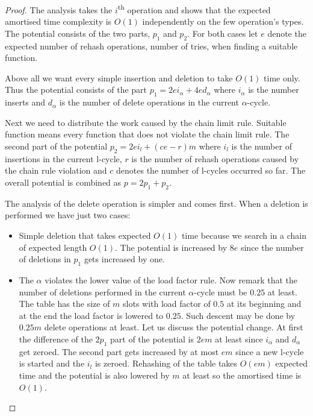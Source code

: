 \begin{proof}
The analysis takes the $i$\textsuperscript{th} operation and shows that the expected amortised time complexity is $O(1)$ independently on the few operation's types. The potential consists of the two parts, $p_1$ and $p_2$. For both cases let $e$ denote the expected number of rehash operations, number of tries, when finding a suitable function. 

Above all we want every simple insertion and deletion to take $O(1)$ time only. Thus the potential consists of the part $p_1 = 2ei_{\alpha} + 4ed_{\alpha}$ where $i_{\alpha}$ is the number inserts and $d_{\alpha}$ is the number of delete operations in the current $\alpha$-cycle. 

Next we need to distribute the work caused by the chain limit rule. Suitable function means every function that does not violate the chain limit rule. The second part of the potential $p_2 = 2ei_{l} + (ce - r) m$ where $i_l$ is the number of insertions in the current l-cycle, $r$ is the number of rehash operations caused by the chain rule violation and $c$ denotes the number of l-cycles occurred so far. The overall potential is combined as $p = 2p_1 + p_2$.

The analysis of the delete operation is simpler and comes first. When a deletion is performed we have just two cases:
\begin{itemize}
\item Simple deletion that takes expected $O(1)$ time because we search in a chain of expected length $O(1)$. The potential is increased by $8e$ since the number of deletions in $p_1$ gets increased by one.
\item The $\alpha$ violates the lower value of the load factor rule. Now remark that the number of deletions performed in the current $\alpha$-cycle must be $0.25$ at least. The table has the size of $m$ slots with load factor of $0.5$ at its beginning and at the end the load factor is lowered to $0.25$. Such descent may be done by  $0.25 m$ delete operations at least. Let us discuss the potential change. At first the difference of the $2p_1$ part of the potential is $2em$ at least since $i_{\alpha}$ and $d_{\alpha}$ get zeroed. The second part gets increased by at most $em$ since a new l-cycle is started and the $i_l$ is zeroed. Rehashing of the table takes $O(em)$ expected time and the potential is also lowered by $m$ at least so the amortised time is $O(1)$. 
\end{itemize}


\end{proof}
